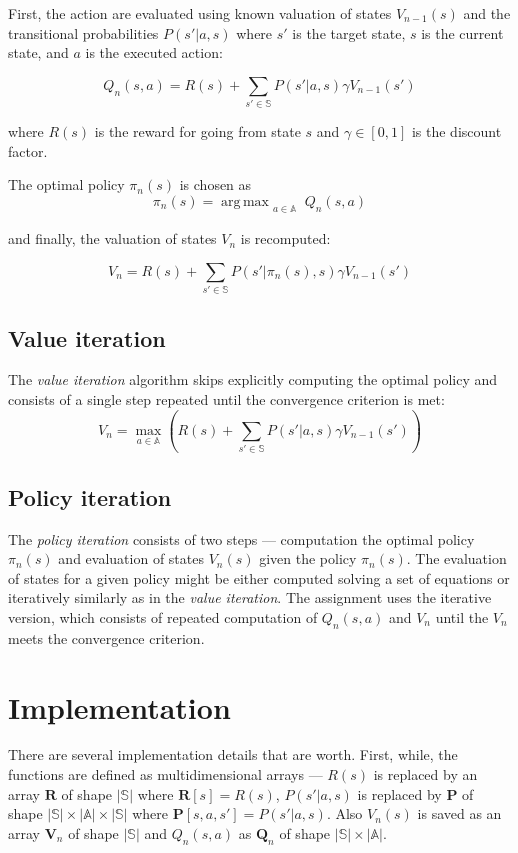 \documentclass[10pt,journal,compsoc,twoside]{IEEEtran}
\newcommand{\matr}[1]{\mathbf{#1}} %
\DeclareMathOperator*{\argmax}{arg\,max}
\begin{document}
First, the action are evaluated using known valuation of states $V_{n-1}(s)$ and the transitional probabilities $P(s' | a, s)$ where $s'$ is the target state, $s$ is the current state, and $a$ is the executed action:

\begin{equation}
    Q_{n}(s,a) =R(s) + \sum_{s' \in \mathbb{S}} P(s' | a, s) \gamma V_{n-1}(s')
\end{equation}

where $R(s)$ is the reward for going from state $s$ and $\gamma \in [0,1]$ is the discount factor.

The optimal policy $\pi_{n}(s)$ is chosen as
\begin{equation}
    \pi_{n}(s) = \argmax_{\substack{
        a \in \mathbb{A}
        }
    } Q_{n}(s,a)
\end{equation}

and finally, the valuation of states $V_n$ is recomputed:

\begin{equation}
    V_n =R(s) + \sum_{s' \in \mathbb{S}} P(s' | \pi_n(s), s) \gamma V_{n-1}(s')
\end{equation}

\subsection{Value iteration}
The \textit{value iteration} algorithm skips explicitly computing the optimal policy and consists of a single step repeated until the convergence criterion is met:
\begin{equation}
    V_n = \max_{a \in \mathbb{A}} \left(R(s) + \sum_{s' \in \mathbb{S}} P(s' | a, s)\gamma V_{n-1}(s')\right)
\end{equation}

\subsection{Policy iteration}
The \textit{policy iteration} consists of two steps --- computation the optimal policy $\pi_n(s)$ and evaluation of states $V_n(s)$ given the policy $\pi_n(s)$. The evaluation of states for a given policy might be either computed solving a set of equations or iteratively similarly as in the \textit{value iteration}. The assignment uses the iterative version, which consists of repeated computation of $Q_{n}(s,a)$ and $V_n$ until the $V_n$ meets the convergence criterion.

\section{Implementation}
There are several implementation details that are worth. First, while, the functions are defined as multidimensional arrays --- $R(s)$ is replaced by an array $\matr{R}$ of shape $|\mathbb{S}|$ where $\matr{R}[s] = R(s)$, $P(s' | a, s)$ is replaced by $\matr{P}$ of shape $|\mathbb{S}| \times |\mathbb{A}| \times |\mathbb{S}|$ where $\matr{P}[s,a,s'] = P(s' | a, s)$. Also $V_n(s)$ is saved as an array $\matr{V}_n$ of shape $|\mathbb{S}|$  and $Q_n(s,a)$ as $\matr{Q}_n$ of shape $|\mathbb{S}| \times |\mathbb{A}|$.
\end{document}

